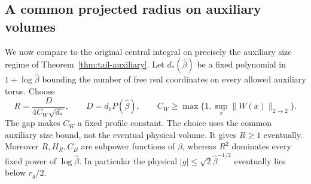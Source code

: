 \documentclass[11pt,reqno]{amsart}
\numberwithin{equation}{section}
\theoremstyle{definition}
\theoremstyle{remark}
\begin{document}
\subsection{A common projected radius on auxiliary volumes}

We now compare to the original central
integral on precisely the auxiliary
size regime of
Theorem~\ref{thm:tail-auxiliary}.
Let \(d_*(\widehat\beta)\) be a fixed
polynomial in \(1+\log\widehat\beta\)
bounding the number of free real
coordinates on every allowed auxiliary
torus. Choose
\begin{equation}
       R=\frac{D}{4C_W\sqrt{d_*}},\qquad
       D=d_0P(\widehat\beta),\qquad
       C_W\ge\max\{1,\sup_x\|W(x)\|_{2\to2}\}.
 \label{eq:connected-common-white-radius}
\end{equation}
The gap makes \(C_W\) a fixed profile
constant. The choice uses the common
auxiliary size bound, not the eventual
physical volume.
It gives \(R\ge1\) eventually.
Moreover \(R,H_R,C_B\) are subpower
functions of \(\widehat\beta\), whereas
\(R^2\) dominates every fixed power
of \(\log\widehat\beta\).
In particular the physical
\(|g|\le\sqrt2\widehat\beta^{-1/2}\)
eventually lies below \(r_g/2\).
\end{document}
